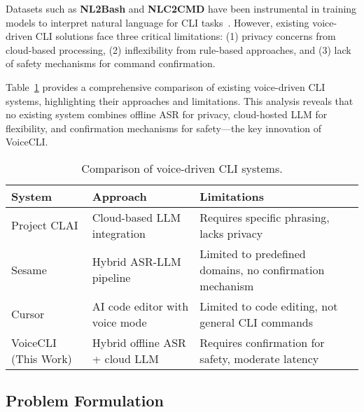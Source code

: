\documentclass[a4paper,12pt]{article}
\begin{document}
Datasets such as \textbf{NL2Bash} and \textbf{NLC2CMD} have been instrumental in training models to interpret natural language for CLI tasks~\cite{ref26,ref27}. However, existing voice-driven CLI solutions face three critical limitations: (1) privacy concerns from cloud-based processing, (2) inflexibility from rule-based approaches, and (3) lack of safety mechanisms for command confirmation.

Table~\ref{tab:relatedwork} provides a comprehensive comparison of existing voice-driven CLI systems, highlighting their approaches and limitations. This analysis reveals that no existing system combines offline ASR for privacy, cloud-hosted LLM for flexibility, and confirmation mechanisms for safety—the key innovation of VoiceCLI.

\begin{table}[h]
    \centering
    \begin{tabular}{|p{3.5cm}|p{4cm}|p{4cm}|}
        \hline
        \textbf{System} & \textbf{Approach} & \textbf{Limitations} \\ \hline
        Project CLAI & Cloud-based LLM integration & Requires specific phrasing, lacks privacy~\cite{ref29} \\ \hline
        Sesame & Hybrid ASR-LLM pipeline & Limited to predefined domains, no confirmation mechanism~\cite{ref30} \\ \hline
        Cursor & AI code editor with voice mode & Limited to code editing, not general CLI commands \\ \hline
        VoiceCLI (This Work) & Hybrid offline ASR + cloud LLM & Requires confirmation for safety, moderate latency \\ \hline
    \end{tabular}
    \caption{Comparison of voice-driven CLI systems.}
    \label{tab:relatedwork}
\end{table}


\subsection{Problem Formulation}
\end{document}
